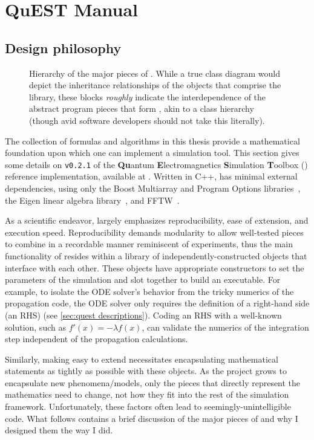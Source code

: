 \chapter{QuEST Manual}

\section{Design philosophy}

\begin{figure}
  \centering
  \caption{\label{fig:hierarchy}Hierarchy of the major pieces of \QuEST{}.
    While a true class diagram would depict the inheritance relationships of the objects that comprise the \QuEST{} library, these blocks \emph{roughly} indicate the interdependence of the abstract program pieces that form \QuEST{}, akin to a class hierarchy (though avid software developers should not take this literally).}
\end{figure}

The collection of formulas and algorithms in this thesis provide a mathematical foundation upon which one can implement a simulation tool. This section gives some details on \texttt{v0.2.1} of the \textbf{Qu}antum \textbf{E}lectromagnetics \textbf{S}imulation \textbf{T}oolbox (\QuEST{}) reference implementation, available at \cite{QuESTimpl}. Written in C++, \QuEST{} has minimal external dependencies, using only the Boost Multiarray and Program Options libraries~\cite{boost}, the Eigen linear algebra library~\cite{eigen}, and FFTW~\cite{FFTW}.

As a scientific endeavor, \QuEST{} largely emphasizes reproducibility, ease of extension, and execution speed.
Reproducibility demands modularity to allow well-tested pieces to combine in a recordable manner reminiscent of experiments, thus the main functionality of \QuEST{} resides within a library of independently-constructed objects that interface with each other.
These objects have appropriate constructors to set the parameters of the simulation and slot together to build an executable.
For example, to isolate the ODE solver's behavior from the tricky numerics of the propagation code, the ODE solver only requires the definition of a right-hand side (an RHS) (see \cref{sec:quest descriptions}).
Coding an RHS with a well-known solution, such as $f'(x) = - \lambda f(x)$, can validate the numerics of the integration step independent of the propagation calculations.

Similarly, making \QuEST{} easy to extend necessitates encapsulating mathematical statements as tightly as possible with these objects.
As the project grows to encapsulate new phenomena/models, only the pieces that directly represent the mathematics need to change, not how they fit into the rest of the simulation framework.
Unfortunately, these factors often lead to seemingly-unintelligible code. What follows contains a brief discussion of the major pieces of \QuEST{} and why I designed them the way I did.

